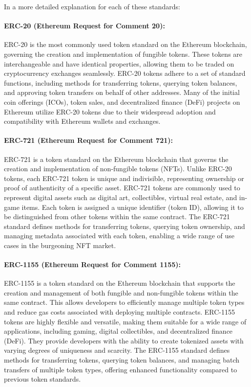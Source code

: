In a more detailed explanation for each of these standards:

\paragraph{ERC-20 (Ethereum Request for Comment 20):}
ERC-20 is the most commonly used token standard on the Ethereum blockchain, governing the creation and implementation of fungible tokens. These tokens are interchangeable and have identical properties, allowing them to be traded on cryptocurrency exchanges seamlessly. ERC-20 tokens adhere to a set of standard functions, including methods for transferring tokens, querying token balances, and approving token transfers on behalf of other addresses. Many of the initial coin offerings (ICOs), token sales, and decentralized finance (DeFi) projects on Ethereum utilize ERC-20 tokens due to their widespread adoption and compatibility with Ethereum wallets and exchanges.

\paragraph{ERC-721 (Ethereum Request for Comment 721):}
ERC-721 is a token standard on the Ethereum blockchain that governs the creation and implementation of non-fungible tokens (NFTs). Unlike ERC-20 tokens, each ERC-721 token is unique and indivisible, representing ownership or proof of authenticity of a specific asset. ERC-721 tokens are commonly used to represent digital assets such as digital art, collectibles, virtual real estate, and in-game items. Each token is assigned a unique identifier (token ID), allowing it to be distinguished from other tokens within the same contract. The ERC-721 standard defines methods for transferring tokens, querying token ownership, and managing metadata associated with each token, enabling a wide range of use cases in the burgeoning NFT market.

\paragraph{ERC-1155 (Ethereum Request for Comment 1155):}
ERC-1155 is a token standard on the Ethereum blockchain that supports the creation and management of both fungible and non-fungible tokens within the same contract. This allows developers to efficiently manage multiple token types and reduce gas costs associated with deploying multiple contracts. ERC-1155 tokens are highly flexible and versatile, making them suitable for a wide range of applications, including gaming, digital collectibles, and decentralized finance (DeFi). They provide developers with the ability to create tokenized assets with varying degrees of uniqueness and scarcity. The ERC-1155 standard defines methods for transferring tokens, querying token balances, and managing batch transfers of multiple token types, offering enhanced functionality compared to previous token standards.

